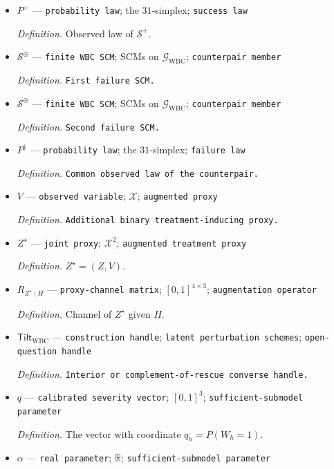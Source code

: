 \documentclass{article}
\begin{document}
\begin{itemize}
  \item \(P^{+}\) --- \texttt{probability law}; the \(31\)-simplex; \texttt{success law}
  \par\smallskip\noindent\emph{Definition.} Observed law of \(\mathcal S^+\).
  \item \(\mathcal S^{\oplus}\) --- \texttt{finite WBC SCM}; SCMs on \(\mathcal G_{\mathrm{WBC}}\); \texttt{counterpair member}
  \par\smallskip\noindent\emph{Definition.} \texttt{First failure SCM.}
  \item \(\mathcal S^{\ominus}\) --- \texttt{finite WBC SCM}; SCMs on \(\mathcal G_{\mathrm{WBC}}\); \texttt{counterpair member}
  \par\smallskip\noindent\emph{Definition.} \texttt{Second failure SCM.}
  \item \(P^{\dagger}\) --- \texttt{probability law}; the \(31\)-simplex; \texttt{failure law}
  \par\smallskip\noindent\emph{Definition.} \texttt{Common observed law of the counterpair.}
  \item \(V\) --- \texttt{observed variable}; \(\mathcal X\); \texttt{augmented proxy}
  \par\smallskip\noindent\emph{Definition.} \texttt{Additional binary treatment-\allowbreak{}inducing proxy.}
  \item \(Z^{\star}\) --- \texttt{joint proxy}; \(\mathcal X^2\); \texttt{augmented treatment proxy}
  \par\smallskip\noindent\emph{Definition.} \(Z^{\star}=(Z,V)\).
  \item \(R_{Z^{\star}\mid H}\) --- \texttt{proxy-\allowbreak{}channel matrix}; \([0,1]^{4\times3}\); \texttt{augmentation operator}
  \par\smallskip\noindent\emph{Definition.} Channel of \(Z^{\star}\) given \(H\).
  \item \(\mathsf{Tilt}_{\mathrm{WBC}}\) --- \texttt{construction handle}; \texttt{latent perturbation schemes}; \texttt{open-\allowbreak{}question handle}
  \par\smallskip\noindent\emph{Definition.} \texttt{Interior or complement-\allowbreak{}of-\allowbreak{}rescue converse handle.}
  \item \(q\) --- \texttt{calibrated severity vector}; \([0,1]^3\); \texttt{sufficient-\allowbreak{}submodel parameter}
  \par\smallskip\noindent\emph{Definition.} The vector with coordinate \(q_h=P(W_h=1)\).
  \item \(\alpha\) --- \texttt{real parameter}; \(\mathbb R\); \texttt{sufficient-\allowbreak{}submodel parameter}

\end{itemize}
\end{document}

